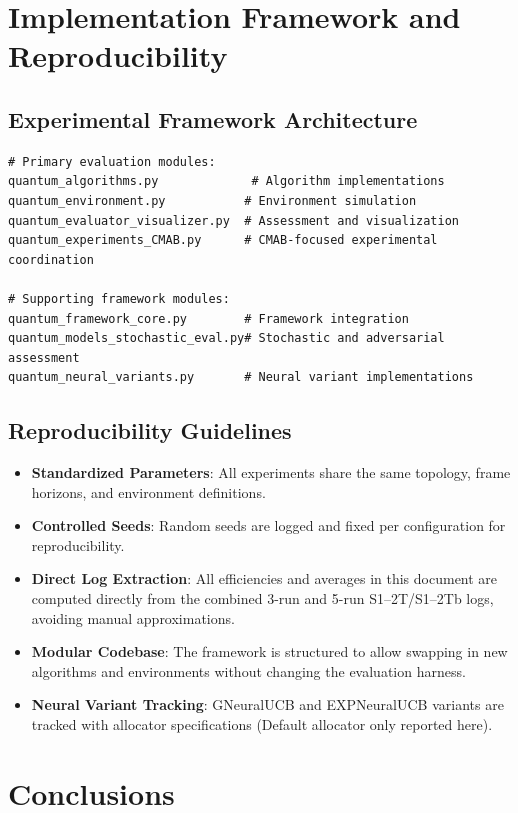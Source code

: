 \documentclass[12pt,a4paper]{article}
\begin{document}
\section{Implementation Framework and Reproducibility}

\subsection{Experimental Framework Architecture}

\begin{lstlisting}[caption=Core Framework Components]
# Primary evaluation modules:
quantum_algorithms.py             # Algorithm implementations
quantum_environment.py           # Environment simulation
quantum_evaluator_visualizer.py  # Assessment and visualization
quantum_experiments_CMAB.py      # CMAB-focused experimental coordination

# Supporting framework modules:
quantum_framework_core.py        # Framework integration
quantum_models_stochastic_eval.py# Stochastic and adversarial assessment
quantum_neural_variants.py       # Neural variant implementations
\end{lstlisting}

\subsection{Reproducibility Guidelines}

\begin{itemize}
\item \textbf{Standardized Parameters}: All experiments share the same topology, frame horizons, and environment definitions.
\item \textbf{Controlled Seeds}: Random seeds are logged and fixed per configuration for reproducibility.
\item \textbf{Direct Log Extraction}: All efficiencies and averages in this document are computed directly from the combined 3-run and 5-run S1–2T/S1–2Tb logs, avoiding manual approximations.
\item \textbf{Modular Codebase}: The framework is structured to allow swapping in new algorithms and environments without changing the evaluation harness.
\item \textbf{Neural Variant Tracking}: GNeuralUCB and EXPNeuralUCB variants are tracked with allocator specifications (Default allocator only reported here).
\end{itemize}

\newpage
\section{Conclusions}
\end{document}

